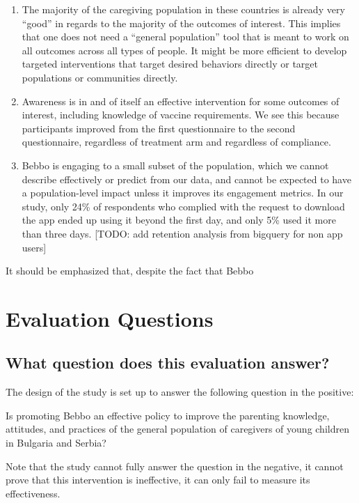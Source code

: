 \documentclass{article}
\begin{document}
\begin{enumerate}
\item The majority of the caregiving population in these countries is already very “good” in regards to the majority of the outcomes of interest. This implies that one does not need a ``general population'' tool that is meant to work on all outcomes across all types of people. It might be more efficient to develop targeted interventions that target desired behaviors directly or target populations or communities directly.
\item Awareness is in and of itself an effective intervention for some outcomes of interest, including knowledge of vaccine requirements. We see this because participants improved from the first questionnaire to the second questionnaire, regardless of treatment arm and regardless of compliance.  
\item Bebbo is engaging to a small subset of the population, which we cannot describe effectively or predict from our data, and cannot be expected to have a population-level impact unless it improves its engagement metrics. In our study, only 24\% of respondents who complied with the request to download the app ended up using it beyond the first day, and only 5\% used it more than three days. [TODO: add retention analysis from bigquery for non app users]
\end{enumerate}

It should be emphasized that, despite the fact that Bebbo 

\section{Evaluation Questions}

\subsection*{What question does this evaluation answer?}
The design of the study is set up to answer the following question in the positive:

\begin{displayquote}
Is promoting Bebbo an effective policy to improve the parenting knowledge, attitudes, and practices of the general population of caregivers of young children in Bulgaria and Serbia?
\end{displayquote}

\noindent Note that the study cannot fully answer the question in the negative, it cannot prove that this intervention is ineffective, it can only fail to measure its effectiveness.
\end{document}
